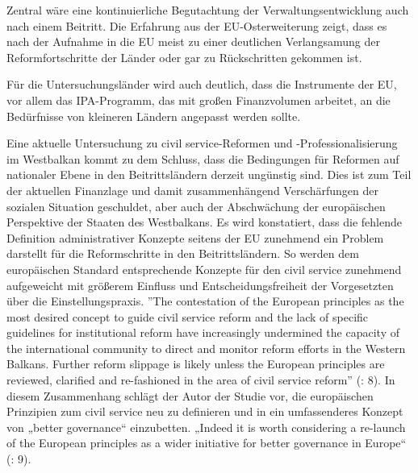 Zentral wäre eine kontinuierliche Begutachtung der Verwaltungsentwicklung auch nach einem Beitritt. Die Erfahrung aus der EU-Osterweiterung zeigt, dass es nach der Aufnahme in die EU meist zu einer deutlichen Verlangsamung der Reformfortschritte der Länder oder gar zu Rückschritten gekommen ist.\par
Für die Untersuchungsländer wird auch deutlich, dass die Instrumente der EU, vor allem das IPA-Programm, das mit großen Finanzvolumen arbeitet, an die Bedürfnisse von kleineren Ländern angepasst werden sollte. \par
Eine aktuelle Untersuchung zu civil service-Reformen und -Professionalisierung im Westbalkan kommt zu dem Schluss, dass die Bedingungen für Reformen auf nationaler Ebene in den Beitrittsländern derzeit ungünstig sind. Dies ist zum Teil der aktuellen Finanzlage und damit zusammenhängend Verschärfungen der sozialen Situation geschuldet, aber auch der Abschwächung der europäischen Perspektive der Staaten des Westbalkans. Es wird konstatiert, dass die fehlende Definition administrativer Konzepte seitens der EU zunehmend ein Problem darstellt für die Reformschritte in den Beitrittsländern. So werden dem europäischen Standard entsprechende Konzepte für den civil service zunehmend aufgeweicht mit größerem Einfluss und Entscheidungsfreiheit der Vorgesetzten über die Einstellungspraxis. ”The contestation of the European principles as the most desired concept to guide civil service reform and the lack of specific guidelines for institutional reform have increasingly undermined the capacity of the international community to direct and monitor reform efforts in the Western Balkans. Further reform slippage is likely unless the European principles are reviewed, clarified and re-fashioned in the area of civil service reform” (\cite{meyersah12}: 8). In diesem Zusammenhang schlägt der Autor der Studie vor, die europäischen Prinzipien zum civil service neu zu definieren und in ein umfassenderes Konzept von „better governance“ einzubetten. „Indeed it is worth considering a re-launch of the European principles as a wider initiative for better governance in Europe“ (\cite{meyersah12}: 9). \par
